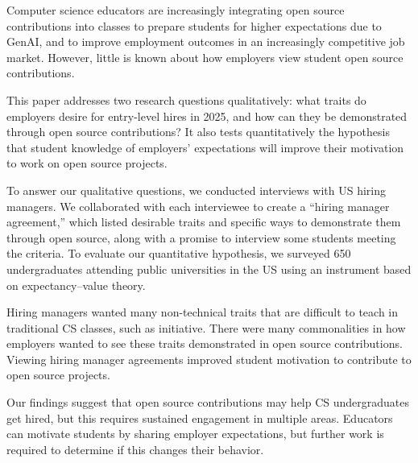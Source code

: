 Computer science educators are increasingly integrating open sou\-rce contributions into classes to prepare students for higher expectations due to GenAI, and to improve employment outcomes in an increasingly competitive job market. However, little is known about how employers view student open source contributions.

This paper addresses two research questions qualitatively: what traits do employers desire for entry-level hires in 2025, and how can they be demonstrated through open source contributions? It also tests quantitatively the hypothesis that student knowledge of employers' expectations will improve their motivation to work on open source projects.

To answer our qualitative questions, we conducted interviews with US hiring managers. We collaborated with each interviewee to create a ``hiring manager agreement,'' which listed desirable traits and specific ways to demonstrate them through open source, along with a promise to interview some students meeting the criteria. To evaluate our quantitative hypothesis, we surveyed 650 undergraduates attending public universities in the US using an instrument based on expectancy--value theory.

Hiring managers wanted many non-technical traits that are difficult to teach in traditional CS classes, such as initiative. There were many commonalities in how employers wanted to see these traits demonstrated in open source contributions. Viewing hiring manager agreements improved student motivation to contribute to open source projects.

Our findings suggest that open source contributions may help CS undergraduates get hired, but this requires sustained engagement in multiple areas. Educators can motivate students by sharing employer expectations, but further work is required to determine if this changes their behavior.